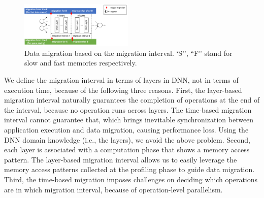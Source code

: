 \begin{figure}
\centering
\includegraphics[width=0.48\textwidth]{figures/migration_interval.pdf}
\vspace{-20pt}
\caption{
\textcolor{jie}{
Data migration based on the migration interval. 
\textcolor{jie}{ `S'', ``F'' stand for slow and fast memories respectively.}}
}
	\centering
	\vspace{-5pt}
	\label{fig:migration_interval} 
\end{figure}

We define the migration interval in terms of layers in DNN, not in terms of execution time, because of the following three reasons. First, the layer-based migration interval naturally guarantees the completion of operations at the end of the interval, because no operation runs across layers. The time-based migration interval cannot guarantee that, which brings inevitable synchronization between application execution and data migration, causing performance loss. Using the DNN domain knowledge (i.e., the layers), we avoid the above problem. Second, each layer is associated with a computation phase that shows a memory access pattern. The layer-based migration interval allows us to easily leverage the memory access patterns collected at the profiling phase to guide data migration. Third, the time-based migration imposes challenges on deciding which operations are in which migration interval, because of operation-level parallelism.

